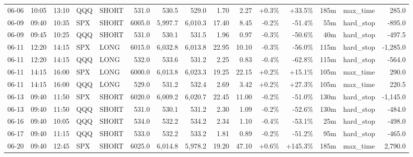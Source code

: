 \documentclass[11pt,a4paper,twoside]{article}
\begin{document}
\begin{landscape}
\begin{center}
\begin{longtable}{>{\color{txtmain}}l l l l l r r r r r r r r >{\color{txtmain}}l r}
06-06 & 10:05 & 13:10 & QQQ & SHORT & 531.0 & 530.5 & 529.0 & 1.70 & 2.27 & \textcolor{wingreen}{+0.3\%} & \textcolor{wingreen}{+33.5\%} & 185m & max\_time & \textcolor{wingreen}{285.0} \\
06-09 & 09:40 & 10:35 & SPX & SHORT & 6005.0 & 5,997.7 & 6,010.3 & 17.40 & 8.45 & \textcolor{lossred}{-0.2\%} & \textcolor{lossred}{-51.4\%} & 55m & hard\_stop & \textcolor{lossred}{-895.0} \\
06-09 & 09:45 & 10:25 & QQQ & SHORT & 531.0 & 530.1 & 531.5 & 1.96 & 0.97 & \textcolor{lossred}{-0.3\%} & \textcolor{lossred}{-50.6\%} & 40m & hard\_stop & \textcolor{lossred}{-497.5} \\
06-11 & 12:20 & 14:15 & SPX & LONG & 6015.0 & 6,032.8 & 6,013.8 & 22.95 & 10.10 & \textcolor{lossred}{-0.3\%} & \textcolor{lossred}{-56.0\%} & 115m & hard\_stop & \textcolor{lossred}{-1,285.0} \\
06-11 & 12:20 & 14:15 & QQQ & LONG & 532.0 & 533.6 & 531.2 & 2.25 & 0.83 & \textcolor{lossred}{-0.4\%} & \textcolor{lossred}{-62.8\%} & 115m & hard\_stop & \textcolor{lossred}{-564.0} \\
06-11 & 14:15 & 16:00 & SPX & LONG & 6000.0 & 6,013.8 & 6,023.3 & 19.25 & 22.15 & \textcolor{wingreen}{+0.2\%} & \textcolor{wingreen}{+15.1\%} & 105m & max\_time & \textcolor{wingreen}{290.0} \\
06-11 & 14:15 & 16:00 & QQQ & LONG & 529.0 & 531.2 & 532.4 & 2.69 & 3.42 & \textcolor{wingreen}{+0.2\%} & \textcolor{wingreen}{+27.3\%} & 105m & max\_time & \textcolor{wingreen}{220.5} \\
06-13 & 09:40 & 11:50 & SPX & SHORT & 6020.0 & 6,009.2 & 6,020.7 & 22.45 & 11.00 & \textcolor{lossred}{-0.2\%} & \textcolor{lossred}{-51.0\%} & 130m & hard\_stop & \textcolor{lossred}{-1,145.0} \\
06-13 & 09:40 & 11:50 & QQQ & SHORT & 531.0 & 530.1 & 531.2 & 2.30 & 1.09 & \textcolor{lossred}{-0.2\%} & \textcolor{lossred}{-52.6\%} & 130m & hard\_stop & \textcolor{lossred}{-484.0} \\
06-16 & 09:40 & 10:05 & QQQ & SHORT & 534.0 & 532.2 & 534.2 & 2.34 & 1.10 & \textcolor{lossred}{-0.4\%} & \textcolor{lossred}{-53.1\%} & 25m & hard\_stop & \textcolor{lossred}{-498.0} \\
06-17 & 09:40 & 11:15 & QQQ & SHORT & 533.0 & 532.2 & 533.2 & 1.81 & 0.89 & \textcolor{lossred}{-0.2\%} & \textcolor{lossred}{-51.2\%} & 95m & hard\_stop & \textcolor{lossred}{-465.0} \\
06-20 & 09:40 & 12:45 & SPX & SHORT & 6025.0 & 6,014.8 & 5,978.2 & 19.20 & 47.10 & \textcolor{wingreen}{+0.6\%} & \textcolor{wingreen}{+145.3\%} & 185m & max\_time & \textcolor{wingreen}{2,790.0} \\

\end{longtable}
\end{center}
\end{landscape}
\end{document}
